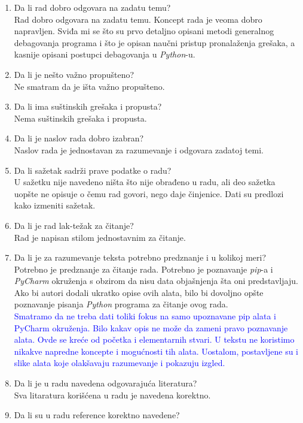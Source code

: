 \documentclass[a4paper]{report}
\newcommand{\odgovor}[1]{\textcolor{blue}{#1}}
\begin{document}
\begin{enumerate}
\item Da li rad dobro odgovara na zadatu temu?\\
Rad dobro odgovara na zadatu temu. Koncept rada je veoma dobro napravljen. Sviđa mi se što su prvo detaljno opisani metodi generalnog debagovanja programa i što je opisan naučni pristup pronalaženja grešaka, a kasnije opisani postupci debagovanja u \emph{Python}-u.
\item Da li je nešto važno propušteno?\\
Ne smatram da je išta važno propušteno.
\item Da li ima suštinskih grešaka i propusta?\\
Nema suštinskih grešaka i propusta.
\item Da li je naslov rada dobro izabran?\\
Naslov rada je jednostavan za razumevanje i odgovara zadatoj temi.
\item Da li sažetak sadrži prave podatke o radu?\\
U sažetku nije navedeno ništa što nije obrađeno u radu, ali deo sažetka uopšte ne opisuje o čemu rad govori, nego daje činjenice. Dati su predlozi kako izmeniti sažetak.
\item Da li je rad lak-težak za čitanje?\\
Rad je napisan stilom jednostavnim za čitanje.
\item Da li je za razumevanje teksta potrebno predznanje i u kolikoj meri?\\
Potrebno je predznanje za čitanje rada. Potrebno je poznavanje \emph{pip}-a i \emph{PyCharm} okruženja s obzirom da nisu data objašnjenja šta oni predstavljaju. Ako bi autori dodali ukratko opise ovih alata, bilo bi dovoljno opšte poznavanje pisanja \emph{Python} programa za čitanje ovog rada. \\
\odgovor{Smatramo da ne treba dati toliki fokus na samo upoznavane pip alata i PyCharm okruženja. Bilo kakav opis ne može da zameni pravo poznavanje alata. Ovde se kreće od početka i elementarnih stvari. U tekstu ne koristimo nikakve napredne koncepte i mogućnosti tih alata. Uostalom, postavljene su i slike alata koje olakšavaju razumevanje i pokazuju izgled.}
\item Da li je u radu navedena odgovarajuća literatura?\\
Sva litaratura korišćena u radu je navedena korektno.
\item Da li su u radu reference korektno navedene?\\

\end{enumerate}
\end{document}
